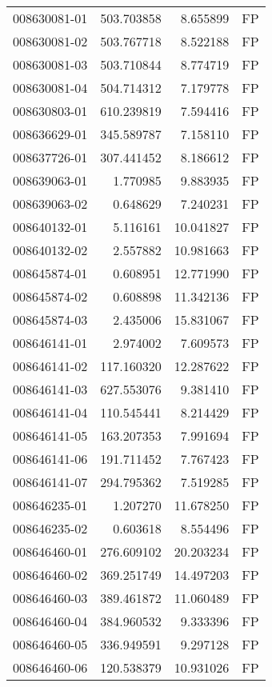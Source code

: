 \begin{tabular}{lrrl}
008630081-01 &  503.703858 &     8.655899 &   FP \\
008630081-02 &  503.767718 &     8.522188 &   FP \\
008630081-03 &  503.710844 &     8.774719 &   FP \\
008630081-04 &  504.714312 &     7.179778 &   FP \\
008630803-01 &  610.239819 &     7.594416 &   FP \\
008636629-01 &  345.589787 &     7.158110 &   FP \\
008637726-01 &  307.441452 &     8.186612 &   FP \\
008639063-01 &    1.770985 &     9.883935 &   FP \\
008639063-02 &    0.648629 &     7.240231 &   FP \\
008640132-01 &    5.116161 &    10.041827 &   FP \\
008640132-02 &    2.557882 &    10.981663 &   FP \\
008645874-01 &    0.608951 &    12.771990 &   FP \\
008645874-02 &    0.608898 &    11.342136 &   FP \\
008645874-03 &    2.435006 &    15.831067 &   FP \\
008646141-01 &    2.974002 &     7.609573 &   FP \\
008646141-02 &  117.160320 &    12.287622 &   FP \\
008646141-03 &  627.553076 &     9.381410 &   FP \\
008646141-04 &  110.545441 &     8.214429 &   FP \\
008646141-05 &  163.207353 &     7.991694 &   FP \\
008646141-06 &  191.711452 &     7.767423 &   FP \\
008646141-07 &  294.795362 &     7.519285 &   FP \\
008646235-01 &    1.207270 &    11.678250 &   FP \\
008646235-02 &    0.603618 &     8.554496 &   FP \\
008646460-01 &  276.609102 &    20.203234 &   FP \\
008646460-02 &  369.251749 &    14.497203 &   FP \\
008646460-03 &  389.461872 &    11.060489 &   FP \\
008646460-04 &  384.960532 &     9.333396 &   FP \\
008646460-05 &  336.949591 &     9.297128 &   FP \\
008646460-06 &  120.538379 &    10.931026 &   FP \\

\end{tabular}
